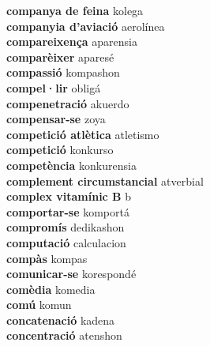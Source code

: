 \textbf{ companya de feina  } kolega \\
\textbf{ companyia d’aviació  } aerolínea \\
\textbf{ compareixença  } aparensia \\
\textbf{ comparèixer  } aparesé \\
\textbf{ compassió  } kompashon \\
\textbf{ compel·lir  } obligá \\
\textbf{ compenetració  } akuerdo \\
\textbf{ compensar-se  } zoya \\
\textbf{ competició atlètica  } atletismo \\
\textbf{ competició  } konkurso \\
\textbf{ competència  } konkurensia \\
\textbf{ complement circumstancial  } atverbial \\
\textbf{ complex vitamínic B  } b \\
\textbf{ comportar-se  } komportá \\
\textbf{ compromís  } dedikashon \\
\textbf{ computació  } calculacion \\
\textbf{ compàs  } kompas \\
\textbf{ comunicar-se  } korespondé \\
\textbf{ comèdia  } komedia \\
\textbf{ comú  } komun \\
\textbf{ concatenació  } kadena \\
\textbf{ concentració  } atenshon \\
